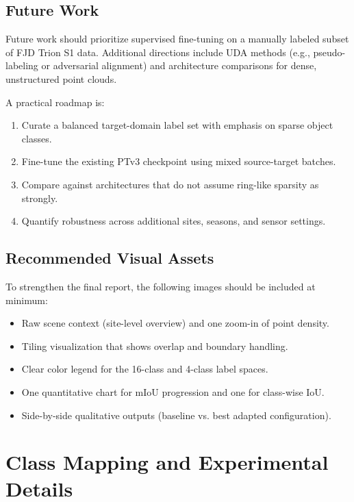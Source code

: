 \documentclass[12pt, a4paper]{report}
\begin{document}
\section{Future Work}
Future work should prioritize supervised fine-tuning on a manually labeled subset of FJD Trion S1 data. Additional directions include \ac{UDA} methods (e.g., pseudo-labeling or adversarial alignment) and architecture comparisons for dense, unstructured point clouds.

A practical roadmap is:
\begin{enumerate}
    \item Curate a balanced target-domain label set with emphasis on sparse object classes.
    \item Fine-tune the existing \ac{PTv3} checkpoint using mixed source-target batches.
    \item Compare against architectures that do not assume ring-like sparsity as strongly.
    \item Quantify robustness across additional sites, seasons, and sensor settings.
\end{enumerate}

\section*{Recommended Visual Assets}
To strengthen the final report, the following images should be included at minimum:
\begin{itemize}
    \item Raw scene context (site-level overview) and one zoom-in of point density.
    \item Tiling visualization that shows overlap and boundary handling.
    \item Clear color legend for the 16-class and 4-class label spaces.
    \item One quantitative chart for mIoU progression and one for class-wise IoU.
    \item Side-by-side qualitative outputs (baseline vs. best adapted configuration).
\end{itemize}
\newpage
\printbibliography[heading=bibintoc, title={References}]

\newpage
\appendix
\chapter{Class Mapping and Experimental Details}
\label{app:class-mapping}
\end{document}
